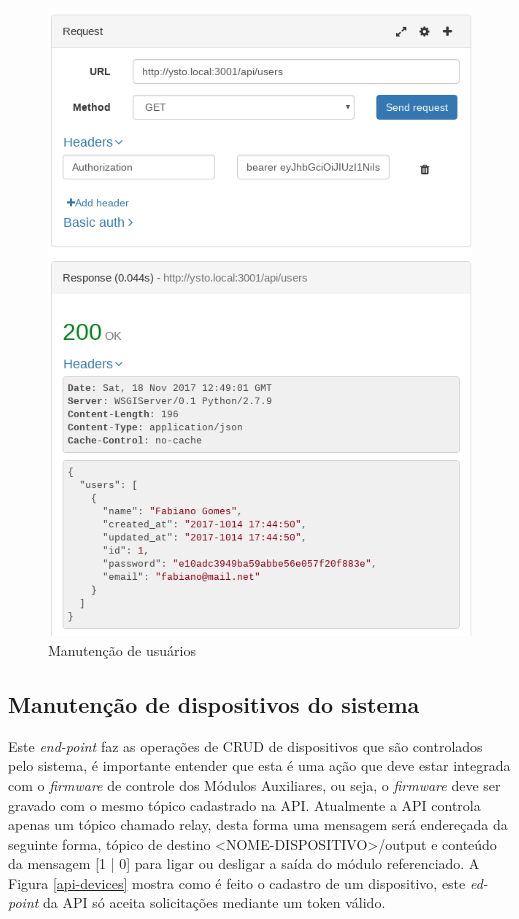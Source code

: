\begin{figure}[H]
\caption{\label{api-users} Manutenção de usuários}
\includegraphics[scale=0.35]{img/07-api-users.png}
\end{figure}

\subsection{Manutenção de dispositivos do sistema}
Este \textit{end-point} faz as operações de CRUD de dispositivos que são controlados pelo sistema, é importante entender que esta é uma ação que deve estar integrada com o \textit{firmware} de controle dos Módulos Auxiliares, ou seja, o \textit{firmware} deve ser gravado com o mesmo tópico cadastrado na API. Atualmente a API controla apenas um tópico chamado relay, desta forma uma mensagem será endereçada da seguinte forma, tópico de destino <NOME-DISPOSITIVO>/output e conteúdo da mensagem [1 | 0] para ligar ou desligar a saída do módulo referenciado. A Figura \ref{api-devices} mostra como é feito o cadastro de um dispositivo, este \textit{ed-point} da API só aceita solicitações mediante um token válido.

